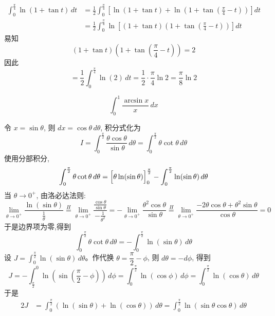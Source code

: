 \begin{questions}
\begin{solution}
\begin{align*}
        \int_0^{\frac{\pi}{4}} \ln(1 + \tan t) \, dt
        &= \frac{1}{2} \int_0^{\frac{\pi}{4}} \left[ \ln(1 + \tan t) + \ln\left(1 + \tan\left(\frac{\pi}{4} - t\right)\right) \right] dt\\
        &= \frac{1}{2} \int_0^{\frac{\pi}{4}} \ln\left[(1 + \tan t)\left(1 + \tan\left(\frac{\pi}{4} - t\right)\right)\right] dt
        \end{align*}
        易知
        \[
        (1 + \tan t)\left(1 + \tan\left(\frac{\pi}{4} - t\right)\right) = 2
        \]
        因此
        \[
        = \frac{1}{2} \int_0^{\frac{\pi}{4}} \ln(2) \, dt = \frac{1}{2} \cdot \frac{\pi}{4} \ln 2 = \frac{\pi}{8} \ln 2
        \]
    \end{solution}

    \question 
    \[
    \int_0^1 \frac{\arcsin x}{x} \,dx
    \]
    \begin{solution}
        令 $x = \sin \theta$, 则 $dx = \cos \theta \,d\theta$, 积分式化为
        \[
        I = \int_0^{\frac{\pi}{2}} \frac{\theta \cos \theta}{\sin \theta} \,d\theta = \int_0^{\frac{\pi}{2}} \theta \cot \theta \,d\theta
        \]
        使用分部积分,
        \[
        \int_{0}^{\frac{\pi}{2}} \theta \cot \theta \, d\theta = \Bigl[\theta \ln(\sin \theta)\Bigr]_{0}^{\frac{\pi}{2}} - \int_{0}^{\frac{\pi}{2}} \ln(\sin \theta) \, d\theta
        \]
        当 $\theta \to 0^+$, 由洛必达法则:
        \[
        \lim_{\theta \to 0^+} \frac{\ln(\sin \theta)}{\frac{1}{\theta}} \overset{H}{=} \lim_{\theta \to 0^+} \frac{\frac{\cos \theta}{\sin \theta}}{-\frac{1}{\theta^2}} = - \lim_{\theta \to 0^+} \frac{\theta^2 \cos \theta}{\sin \theta} \overset{H}{=} \lim_{\theta \to 0^+} \frac{-2\theta \cos \theta + \theta^2 \sin \theta}{\cos \theta} = 0
        \]
        于是边界项为零,得到
        \[
        \int_{0}^{\frac{\pi}{2}} \theta \cot \theta \, d\theta = - \int_{0}^{\frac{\pi}{2}} \ln(\sin \theta) \, d\theta
        \]
        设 $\displaystyle J = \int_{0}^{\frac{\pi}{2}} \ln(\sin \theta) \, d\theta$。作代换 $\theta = \dfrac{\pi}{2} - \phi$, 则 $d\theta = -d\phi$, 得到
        \[
        J = - \int_{\frac{\pi}{2}}^{0} \ln\left( \sin\left( \frac{\pi}{2} - \phi \right) \right) \,d\phi = \int_{0}^{\frac{\pi}{2}} \ln(\cos \phi) \, d\phi = \int_{0}^{\frac{\pi}{2}} \ln(\cos \theta) \, d\theta
        \]
        于是
        \begin{align*}
        2J &= \int_{0}^{\frac{\pi}{2}} \left( \ln(\sin \theta) + \ln(\cos \theta) \right) \, d\theta = \int_{0}^{\frac{\pi}{2}} \ln(\sin \theta \cos \theta) \, d\theta \\

\end{align*}
\end{solution}
\end{questions}
